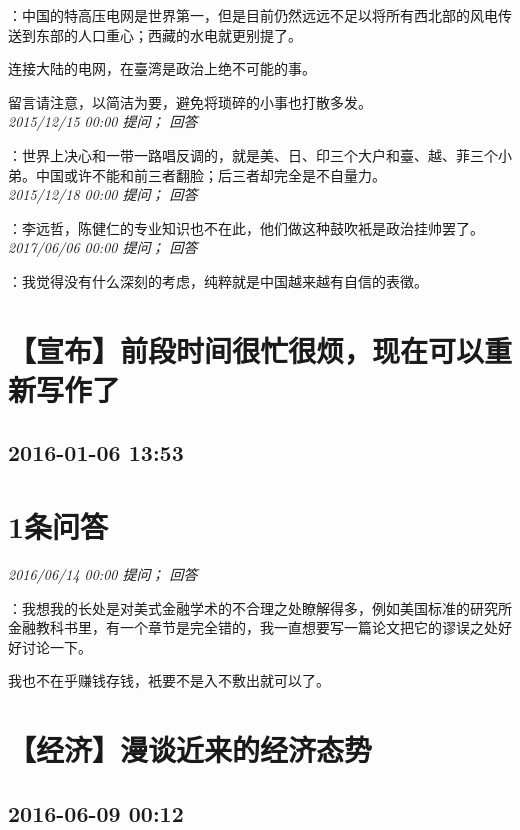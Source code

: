 \documentclass[twocolumn]{ctexart}
\begin{document}
：中国的特高压电网是世界第一，但是目前仍然远远不足以将所有西北部的风电传送到东部的人口重心；西藏的水电就更别提了。

连接大陆的电网，在臺湾是政治上绝不可能的事。

留言请注意，以简洁为要，避免将琐碎的小事也打散多发。\\

\textit{\hfill\noindent\small 2015/12/15 00:00 提问； 回答}

：世界上决心和一带一路唱反调的，就是美、日、印三个大户和臺、越、菲三个小弟。中国或许不能和前三者翻脸；后三者却完全是不自量力。\\

\textit{\hfill\noindent\small 2015/12/18 00:00 提问； 回答}

：李远哲，陈健仁的专业知识也不在此，他们做这种鼓吹衹是政治挂帅罢了。\\

\textit{\hfill\noindent\small 2017/06/06 00:00 提问； 回答}

：我觉得没有什么深刻的考虑，纯粹就是中国越来越有自信的表徵。\\


\section{【宣布】前段时间很忙很烦，现在可以重新写作了}
\subsection{2016-01-06 13:53}


\section{1条问答}

\textit{\hfill\noindent\small 2016/06/14 00:00 提问； 回答}

：我想我的长处是对美式金融学术的不合理之处瞭解得多，例如美国标准的研究所金融教科书里，有一个章节是完全错的，我一直想要写一篇论文把它的谬误之处好好讨论一下。

我也不在乎赚钱存钱，衹要不是入不敷出就可以了。\\


\section{【经济】漫谈近来的经济态势}
\subsection{2016-06-09 00:12}
\end{document}
